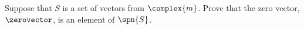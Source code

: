 Suppose that $S$ is a set of vectors from $\complex{m}$.  Prove that the zero vector, $\zerovector$, is an element of $\spn{S}$.